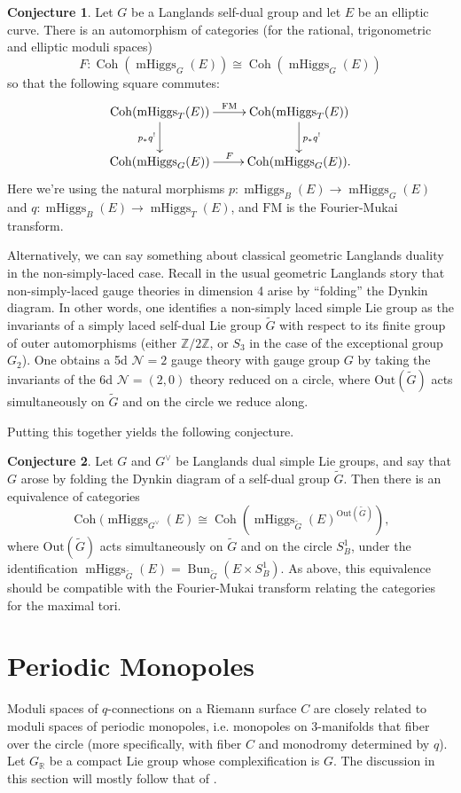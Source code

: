 \documentclass[11pt, oneside, reqno]{amsart}
\theoremstyle{definition} \newtheorem{definition}{Definition}[section]
\newtheorem{conjecture}[definition]{Conjecture}
\theoremstyle{definition} \newtheorem{remark}[definition]{Remark}
\theoremstyle{definition} \newtheorem{remarks}[definition]{Remarks}
\theoremstyle{definition} \newtheorem{question}[definition]{Question}
\theoremstyle{definition} \newtheorem*{note}{Note}
\theoremstyle{definition} \newtheorem{example}[definition]{Example}
\theoremstyle{definition} \newtheorem{examples}[definition]{Examples}
\newcommand{\mr}[1]{\mathrm{#1}}
\newcommand{\mc}[1]{\mathcal{#1}}
\newcommand{\wt}[1]{\widetilde{#1}}
\newcommand{\RR}{\mathbb{R}}
\newcommand{\ZZ}{\mathbb{Z}}
\newcommand{\iso}{\cong}
\DeclareMathOperator{\coh}{Coh}
\DeclareMathOperator{\bun}{Bun}
\DeclareMathOperator{\mhiggs}{mHiggs}
\begin{document}
\begin{conjecture}
Let $G$ be a Langlands self-dual group and let $E$ be an elliptic curve.  There is an automorphism of categories (for the rational, trigonometric and elliptic moduli spaces)
\[F \colon \coh(\mhiggs_G(E)) \iso \coh(\mhiggs_{G}(E))\]
so that the following square commutes:
\[\xymatrix{
\coh(\mhiggs_T(E)) \ar[r]^{\mathrm{FM}} \ar[d]_{p_*q^!} &\coh(\mhiggs_T(E)) \ar[d]^{p_*q^!} \\
\coh(\mhiggs_G(E)) \ar[r]^{F} &\coh(\mhiggs_G(E)).
}\]
Here we're using the natural morphisms $p \colon \mhiggs_B(E) \to \mhiggs_G(E)$ and $q \colon \mhiggs_B(E) \to \mhiggs_T(E)$, and $\mr{FM}$ is the Fourier-Mukai transform.
\end{conjecture}

Alternatively, we can say something about classical geometric Langlands duality in the non-simply-laced case.  Recall in the usual geometric Langlands story that non-simply-laced gauge theories in dimension 4 arise by ``folding'' the Dynkin diagram.  In other words, one identifies a non-simply laced simple Lie group as the invariants of a simply laced self-dual Lie group $\wt G$ with respect to its finite group of outer automorphisms (either $\ZZ/2\ZZ$, or $S_3$ in the case of the exceptional group $G_2$).  One obtains a 5d $\mc N=2$ gauge theory with gauge group $G$ by taking the invariants of the 6d $\mc N=(2,0)$ theory reduced on a circle, where $\mr{Out}(\wt G)$ acts simultaneously on $\wt G$ and on the circle we reduce along.

Putting this together yields the following conjecture.
\begin{conjecture}
\label{eq:classical-q-langlands}
Let $G$ and $G^\vee$ be Langlands dual simple Lie groups, and say that $G$ arose by folding the Dynkin diagram of a self-dual group $\wt G$.  Then there is an equivalence of categories
\[\coh(\mhiggs_{G^\vee}(E) \iso \coh(\mhiggs_{\wt G}(E)^{\mr{Out}(\wt G)}),\]
where $\mr{Out}(\wt G)$ acts simultaneously on $\wt G$ and on the circle $S^1_B$, under the identification $\mhiggs_{\wt G}(E) = \bun_{\wt G}(E \times S^1_B)$.  As above, this equivalence should be compatible with the Fourier-Mukai transform relating the categories for the maximal tori.
\end{conjecture}

\section{Periodic Monopoles} \label{periodic_monopole_section}
Moduli spaces of $q$-connections on a Riemann surface $C$ are closely related to moduli spaces of periodic monopoles, i.e. monopoles on 3-manifolds that fiber over the circle (more specifically, with fiber $C$ and monodromy determined by $q$).  Let $G_\RR$ be a compact Lie group whose complexification is $G$.  The discussion in this section will mostly follow that of \cite{CharbonneauHurtubise, Smith}.
\end{document}
